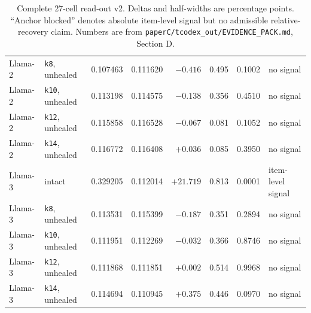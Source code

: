 \begin{table}[t]
\begin{tabular}{llrrrrrl}
Llama-2 & \texttt{k8}, unhealed & 0.107463 & 0.111620 & $-0.416$ & 0.495 & 0.1002 & no signal \\
Llama-2 & \texttt{k10}, unhealed & 0.113198 & 0.114575 & $-0.138$ & 0.356 & 0.4510 & no signal \\
Llama-2 & \texttt{k12}, unhealed & 0.115858 & 0.116528 & $-0.067$ & 0.081 & 0.1052 & no signal \\
Llama-2 & \texttt{k14}, unhealed & 0.116772 & 0.116408 & $+0.036$ & 0.085 & 0.3950 & no signal \\
Llama-3 & intact & 0.329205 & 0.112014 & $+21.719$ & 0.813 & 0.0001 & item-level signal \\
Llama-3 & \texttt{k8}, unhealed & 0.113531 & 0.115399 & $-0.187$ & 0.351 & 0.2894 & no signal \\
Llama-3 & \texttt{k10}, unhealed & 0.111951 & 0.112269 & $-0.032$ & 0.366 & 0.8746 & no signal \\
Llama-3 & \texttt{k12}, unhealed & 0.111868 & 0.111851 & $+0.002$ & 0.514 & 0.9968 & no signal \\
Llama-3 & \texttt{k14}, unhealed & 0.114694 & 0.110945 & $+0.375$ & 0.446 & 0.0970 & no signal \\
\bottomrule
\end{tabular}
\caption{Complete 27-cell read-out v2. Deltas and half-widths are percentage points. ``Anchor blocked'' denotes absolute item-level signal but no admissible relative-recovery claim. Numbers are from \texttt{paperC/tcodex\_out/EVIDENCE\_PACK.md}, Section D.}
\label{tab:v2-full}
\end{table}
